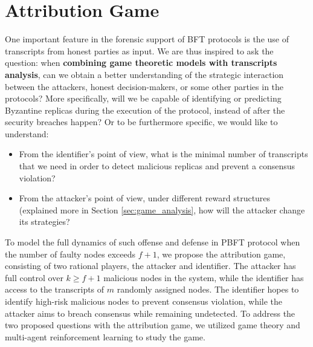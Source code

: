 \documentclass[a4paper,11pt]{article}
\begin{document}
\section{Attribution Game}\label{sec:idea}
One important feature in the forensic support of BFT protocols \cite{sheng2021bft} is the use of transcripts from honest parties as input. We are thus inspired to ask the question: when \textbf{combining game theoretic models with transcripts analysis}, can we obtain a better understanding of the strategic interaction between the attackers, honest decision-makers, or some other parties in the protocols? More specifically, will we be capable of identifying or predicting Byzantine replicas during the execution of the protocol, instead of after the security breaches happen? Or to be furthermore specific, we would like to understand:
\begin{itemize}
    \item From the identifier's point of view, what is the minimal number of transcripts that we need in order to detect malicious replicas and prevent a consensus violation?
    \item From the attacker's point of view, under different reward structures (explained more in Section \ref{sec:game_analysis}, how will the attacker change its strategies?
\end{itemize}
To model the full dynamics of such offense and defense in PBFT protocol when the number of faulty nodes exceeds $f+1$, we propose the attribution game, consisting of two rational players, the attacker and identifier.
The attacker has full control over $k \geq f+1$ malicious nodes in the system, while the identifier has access to the transcripts of $m$ randomly assigned nodes. The identifier hopes to identify high-risk malicious nodes to prevent consensus violation, while the attacker aims to breach consensus while remaining undetected. To address the two proposed questions with the attribution game, we utilized game theory and multi-agent reinforcement learning to study the game.






\end{document}
